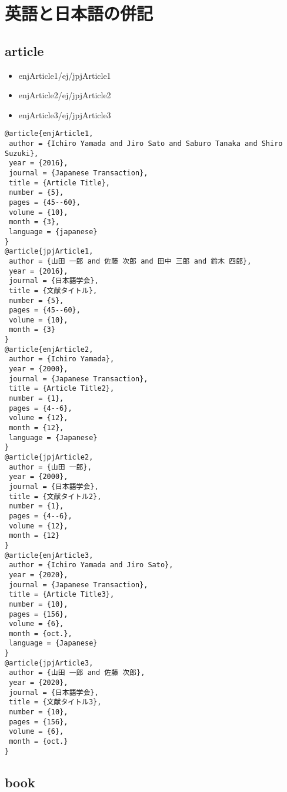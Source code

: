 \documentclass[9pt, twocolumn, a4paper]{jsarticle}
\begin{document}
\section{英語と日本語の併記}
\begin{bibunit}[jIEEEtran]

\subsection{article}

\begin{itemize}
  \item enjArticle1/ej/jpjArticle1 \cite{enjArticle1/ej/jpjArticle1}
  \item enjArticle2/ej/jpjArticle2 \cite{enjArticle2/ej/jpjArticle2}
  \item enjArticle3/ej/jpjArticle3 \cite{enjArticle3/ej/jpjArticle3}
\end{itemize}

\begin{lstlisting}
@article{enjArticle1,
 author = {Ichiro Yamada and Jiro Sato and Saburo Tanaka and Shiro Suzuki},
 year = {2016},
 journal = {Japanese Transaction},
 title = {Article Title},
 number = {5},
 pages = {45--60},
 volume = {10},
 month = {3},
 language = {japanese}
}
@article{jpjArticle1,
 author = {山田 一郎 and 佐藤 次郎 and 田中 三郎 and 鈴木 四郎},
 year = {2016},
 journal = {日本語学会},
 title = {文献タイトル},
 number = {5},
 pages = {45--60},
 volume = {10},
 month = {3}
}
@article{enjArticle2,
 author = {Ichiro Yamada},
 year = {2000},
 journal = {Japanese Transaction},
 title = {Article Title2},
 number = {1},
 pages = {4--6},
 volume = {12},
 month = {12},
 language = {Japanese}
}
@article{jpjArticle2,
 author = {山田 一郎},
 year = {2000},
 journal = {日本語学会},
 title = {文献タイトル2},
 number = {1},
 pages = {4--6},
 volume = {12},
 month = {12}
}
@article{enjArticle3,
 author = {Ichiro Yamada and Jiro Sato},
 year = {2020},
 journal = {Japanese Transaction},
 title = {Article Title3},
 number = {10},
 pages = {156},
 volume = {6},
 month = {oct.},
 language = {Japanese}
}
@article{jpjArticle3,
 author = {山田 一郎 and 佐藤 次郎},
 year = {2020},
 journal = {日本語学会},
 title = {文献タイトル3},
 number = {10},
 pages = {156},
 volume = {6},
 month = {oct.}
}
\end{lstlisting}

\subsection{book}


\end{bibunit}
\end{document}
